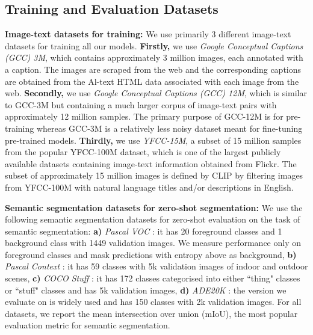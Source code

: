 \documentclass[10pt,twocolumn,letterpaper]{article}
\begin{document}
\subsection {Training and Evaluation Datasets}
\label{app:training_eval_datasets}

\textbf{Image-text datasets for training: } We use primarily 3 different image-text datasets for training all our models. \textbf{Firstly,} we use \emph{Google Conceptual Captions (GCC) 3M}, which contains approximately 3 million images, each annotated with a caption. The images are scraped from the web and the corresponding captions are obtained from the Al-text HTML data associated with each image from the web. \textbf{Secondly,} we use \emph{Google Conceptual Captions (GCC) 12M}, which is similar to GCC-3M but containing a much larger corpus of image-text pairs with approximately 12 million samples. The primary purpose of GCC-12M is for pre-training whereas GCC-3M is a relatively less noisy dataset meant for fine-tuning pre-trained models. \textbf{Thirdly,} we use \emph{YFCC-15M}, a subset of 15 million samples from the popular YFCC-100M \cite{thomee2016yfcc100m} dataset, which is one of the largest publicly available datasets containing image-text information obtained from Flickr. The subset of approximately 15 million images is defined by CLIP \cite{radford2021learning} by filtering images from YFCC-100M with natural language titles and/or descriptions in English.   

\textbf{Semantic segmentation datasets for zero-shot segmentation: } We use the following semantic segmentation datasets for zero-shot evaluation on the task of semantic segmentation: \textbf{a)} \emph{Pascal VOC} \cite{Everingham10}: it has 20 foreground classes and 1 background class with 1449 validation images. We measure performance only on foreground classes and mask predictions with entropy above  as background, \textbf{b)} \emph{Pascal Context} \cite{mottaghi_cvpr14}: it has 59 classes with 5k validation images of indoor and outdoor scenes, \textbf{c)} \emph{COCO Stuff} \cite{caesar2018coco}: it has 172 classes categorised into either ``thing" classes or ``stuff" classes and has 5k validation images, \textbf{d)} \emph{ADE20K} \cite{zhou2017scene}: the version we evaluate on is widely used and has 150 classes with 2k validation images. For all datasets, we report the mean intersection over union (mIoU), the most popular evaluation metric for semantic segmentation.
\end{document}
